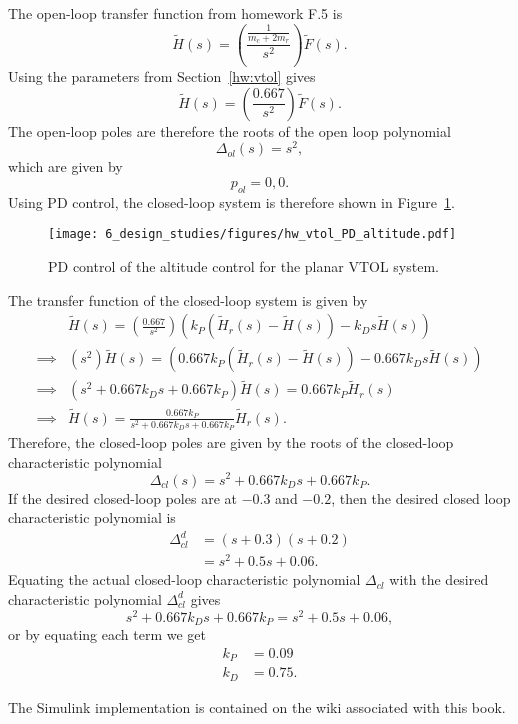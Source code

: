 
The open-loop transfer function from homework F.5 is
\[
\tilde{H}(s) = \left(\frac{\frac{1}{m_c+2m_r}}{s^2}\right)\tilde{F}(s).  
\]
Using the parameters from Section~\ref{hw:vtol} gives
\[
\tilde{H}(s) = \left(\frac{0.667}{s^2}\right)\tilde{F}(s).  
\]
The open-loop poles are therefore the roots of the open loop polynomial
\[
\Delta_{ol}(s) = s^2,
\]
which are given by
\[
p_{ol} = 0, 0.
\]
Using PD control, the closed-loop system is therefore shown in Figure~\ref{fig:hw_vtol_PD_altitude}.
\begin{figure}[H]
   \centering
   \texttt{[image: 6\_design\_studies/figures/hw\_vtol\_PD\_altitude.pdf]}
   \caption{PD control of the altitude control for the planar VTOL system.}
   \label{fig:hw_vtol_PD_altitude}
\end{figure}
The transfer function of the closed-loop system is given by
\begin{align*}
& \tilde{H}(s) = \left(\frac{0.667}{s^2}\right)\left(k_P (\tilde{H}_r(s)-\tilde{H}(s)) - k_D s \tilde{H}(s) \right)  \\
\implies & (s^2)\tilde{H}(s) = \left(0.667 k_P (\tilde{H}_r(s)-\tilde{H}(s)) - 0.667 k_D s \tilde{H}(s) \right) \\
\implies & (s^2 + 0.667k_Ds + 0.667k_P)\tilde{H}(s) = 0.667k_P \tilde{H}_r(s)  \\
\implies & \tilde{H}(s) = \frac{0.667k_P}{s^2 + 0.667k_Ds + 0.667k_P}\tilde{H}_r(s). 
\end{align*}
Therefore, the closed-loop poles are given by the roots of the closed-loop characteristic polynomial
\[
\Delta_{cl}(s) = s^2 + 0.667k_Ds + 0.667k_P.
\]
If the desired closed-loop poles are at $-0.3$ and $-0.2$, then the desired closed loop characteristic polynomial is
\begin{align*}
\Delta_{cl}^d &= (s+0.3)(s+0.2) \\
 &= s^2 + 0.5s + 0.06.
\end{align*}
Equating the actual closed-loop characteristic polynomial $\Delta_{cl}$ with the desired characteristic polynomial $\Delta_{cl}^d$ gives
\[
s^2 + 0.667k_Ds + 0.667k_P = s^2 + 0.5s + 0.06,
\]
or by equating each term we get 
\begin{align*}
k_P &= 0.09 \\
k_D &= 0.75.
\end{align*}

The Simulink implementation is contained on the wiki associated with this book.